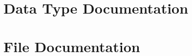 \documentclass[a4paper]{book}
\begin{document}
\chapter{Data Type Documentation}


















\chapter{File Documentation}











\printindex
\end{document}
